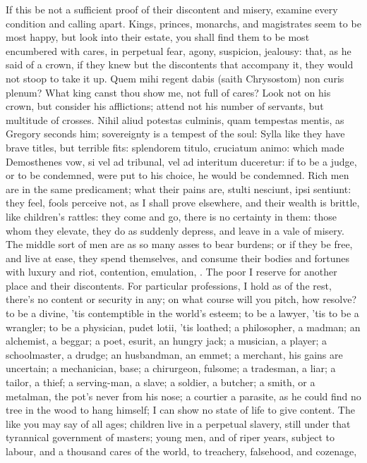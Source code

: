 {If this be not a sufficient proof of their discontent and misery,
examine every condition and calling apart. Kings, princes, monarchs,
and magistrates seem to be most happy, but look into their estate, you
shall find them to be most encumbered with cares, in perpetual
fear, agony, suspicion, jealousy: that, as he said of a crown, if
they knew but the discontents that accompany it, they would not stoop
to take it up. Quem mihi regent dabis (saith Chrysostom) non curis
plenum? What king canst thou show me, not full of cares? Look not
on his crown, but consider his afflictions; attend not his number of
servants, but multitude of crosses. Nihil aliud potestas culminis, quam
tempestas mentis, as Gregory seconds him; sovereignty is a tempest of
the soul: Sylla like they have brave titles, but terrible fits:
splendorem titulo, cruciatum animo: which made Demosthenes vow,
si vel ad tribunal, vel ad interitum duceretur: if to be a judge, or to
be condemned, were put to his choice, he would be condemned. Rich men
are in the same predicament; what their pains are, stulti nesciunt,
ipsi sentiunt: they feel, fools perceive not, as I shall prove
elsewhere, and their wealth is brittle, like children's rattles: they
come and go, there is no certainty in them: those whom they elevate,
they do as suddenly depress, and leave in a vale of misery. The middle
sort of men are as so many asses to bear burdens; or if they be free,
and live at ease, they spend themselves, and consume their bodies and
fortunes with luxury and riot, contention, emulation, \etc{}. The poor I
reserve for another place and their discontents.
For particular professions, I hold as of the rest, there's no content
or security in any; on what course will you pitch, how resolve? to be a
divine, 'tis contemptible in the world's esteem; to be a lawyer, 'tis
to be a wrangler; to be a physician, pudet lotii, 'tis loathed; a
philosopher, a madman; an alchemist, a beggar; a poet, esurit, an
hungry jack; a musician, a player; a schoolmaster, a drudge; an
husbandman, an emmet; a merchant, his gains are uncertain; a
mechanician, base; a chirurgeon, fulsome; a tradesman, a liar; a
tailor, a thief; a serving-man, a slave; a soldier, a butcher; a smith,
or a metalman, the pot's never from his nose; a courtier a parasite, as
he could find no tree in the wood to hang himself; I can show no state
of life to give content. The like you may say of all ages; children
live in a perpetual slavery, still under that tyrannical government of
masters; young men, and of riper years, subject to labour, and a
thousand cares of the world, to treachery, falsehood, and cozenage,

}
